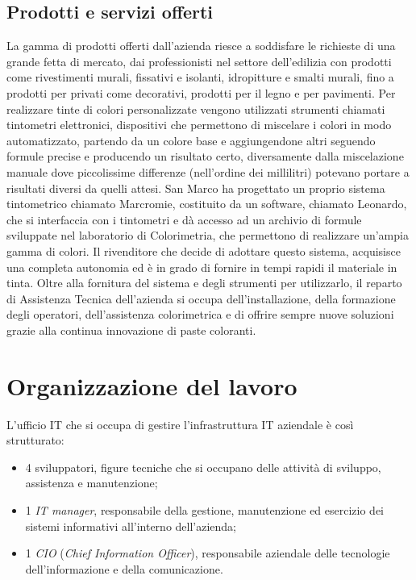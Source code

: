 \subsection{Prodotti e servizi offerti}
La gamma di prodotti offerti dall'azienda riesce a soddisfare le richieste di una grande fetta di mercato, dai professionisti nel settore dell'edilizia con prodotti come rivestimenti murali, fissativi e isolanti, idropitture e smalti murali, fino a prodotti per privati come decorativi, prodotti per il legno e per pavimenti.
Per realizzare tinte di colori personalizzate vengono utilizzati strumenti chiamati tintometri elettronici, dispositivi che permettono di miscelare i colori in modo automatizzato, partendo da un colore base e aggiungendone altri seguendo formule precise e producendo un risultato certo, diversamente dalla miscelazione manuale dove piccolissime differenze (nell'ordine dei millilitri) potevano portare a risultati diversi da quelli attesi. San Marco ha progettato un proprio sistema tintometrico chiamato Marcromie, costituito da un software, chiamato Leonardo, che si interfaccia con i tintometri e dà accesso ad un archivio di formule sviluppate nel laboratorio di Colorimetria, che permettono di realizzare un'ampia gamma di colori. Il rivenditore che decide di adottare questo sistema, acquisisce una completa autonomia ed è in grado di fornire in tempi rapidi il materiale in tinta. Oltre alla fornitura del sistema e degli strumenti per utilizzarlo, il reparto di Assistenza Tecnica dell'azienda si occupa dell'installazione, della formazione degli operatori, dell'assistenza colorimetrica e di offrire sempre nuove soluzioni grazie alla continua innovazione di paste coloranti. 


\section{Organizzazione del lavoro}

L'ufficio IT che si occupa di gestire l'infrastruttura IT aziendale è così strutturato: 
\begin{itemize}
	\item 4 sviluppatori, figure tecniche che si occupano delle attività di sviluppo, assistenza e manutenzione; 
	\item 1 \textit{IT manager}, responsabile della gestione, manutenzione ed esercizio dei sistemi informativi all'interno dell'azienda; 
	\item 1 \textit{CIO} (\textit{Chief Information Officer}), responsabile aziendale delle tecnologie dell'informazione e della comunicazione.
\end{itemize}


